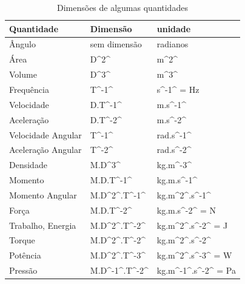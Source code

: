 \documentclass[
  portuguese,
  ]{book}
\begin{document}
\begin{table}

\caption{\label{tab:unnamed-chunk-2}Dimensões de algumas quantidades}
\centering
\begin{tabular}[t]{l|l|l}
\hline
Quantidade & Dimensão & unidade\\
\hline
Ângulo & sem dimensão & radianos\\
\hline
Área & D\textasciicircum{}2\textasciicircum{} & m\textasciicircum{}2\textasciicircum{}\\
\hline
Volume & D\textasciicircum{}3\textasciicircum{} & m\textasciicircum{}3\textasciicircum{}\\
\hline
Frequência & T\textasciicircum{}-1\textasciicircum{} & s\textasciicircum{}-1\textasciicircum{} = Hz\\
\hline
Velocidade & D.T\textasciicircum{}-1\textasciicircum{} & m.s\textasciicircum{}-1\textasciicircum{}\\
\hline
Aceleração & D.T\textasciicircum{}-2\textasciicircum{} & m.s\textasciicircum{}-2\textasciicircum{}\\
\hline
Velocidade Angular & T\textasciicircum{}-1\textasciicircum{} & rad.s\textasciicircum{}-1\textasciicircum{}\\
\hline
Aceleração Angular & T\textasciicircum{}-2\textasciicircum{} & rad.s\textasciicircum{}-2\textasciicircum{}\\
\hline
Densidade & M.D\textasciicircum{}3\textasciicircum{} & kg.m\textasciicircum{}-3\textasciicircum{}\\
\hline
Momento & M.D.T\textasciicircum{}-1\textasciicircum{} & kg.m.s\textasciicircum{}-1\textasciicircum{}\\
\hline
Momento Angular & M.D\textasciicircum{}2\textasciicircum{}.T\textasciicircum{}-1\textasciicircum{} & kg.m\textasciicircum{}2\textasciicircum{}.s\textasciicircum{}-1\textasciicircum{}\\
\hline
Força & M.D.T\textasciicircum{}-2\textasciicircum{} & kg.m.s\textasciicircum{}-2\textasciicircum{} = N\\
\hline
Trabalho, Energia & M.D\textasciicircum{}2\textasciicircum{}.T\textasciicircum{}-2\textasciicircum{} & kg.m\textasciicircum{}2\textasciicircum{}.s\textasciicircum{}-2\textasciicircum{} = J\\
\hline
Torque & M.D\textasciicircum{}2\textasciicircum{}.T\textasciicircum{}-2\textasciicircum{} & kg.m\textasciicircum{}2\textasciicircum{}.s\textasciicircum{}-2\textasciicircum{}\\
\hline
Potência & M.D\textasciicircum{}2\textasciicircum{}.T\textasciicircum{}-3\textasciicircum{} & kg.m\textasciicircum{}2\textasciicircum{}.s\textasciicircum{}-3\textasciicircum{} = W\\
\hline
Pressão & M.D\textasciicircum{}-1\textasciicircum{}.T\textasciicircum{}-2\textasciicircum{} & kg.m\textasciicircum{}-1\textasciicircum{}.s\textasciicircum{}-2\textasciicircum{} = Pa\\
\hline
\end{tabular}
\end{table}
\end{document}
